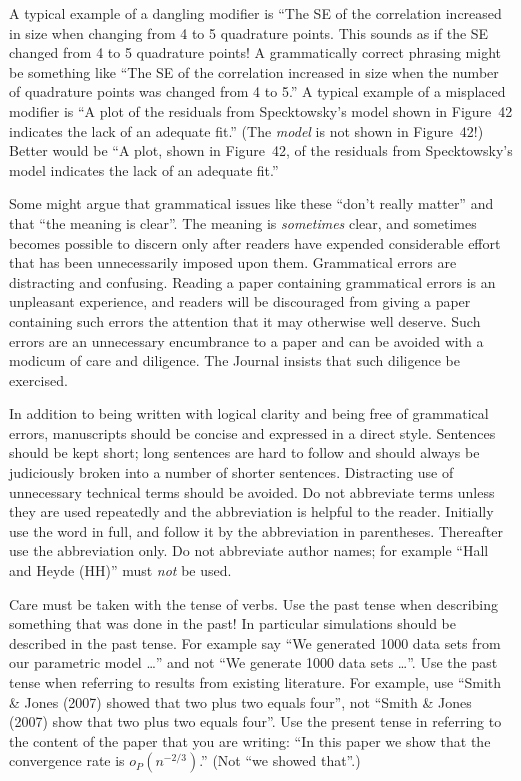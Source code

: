 \documentclass[times, doublespace]{anzsauth}
\begin{document}
A typical example of a dangling modifier is ``The SE of the
correlation increased in size when changing from 4 to 5 quadrature
points.  This sounds as if the SE changed from 4 to 5 quadrature
points!  A grammatically correct phrasing might be something like
``The SE of the correlation increased in size when the number of
quadrature points was changed from 4 to 5.''  A typical example of a
misplaced modifier is ``A plot of the residuals from Specktowsky's
model shown in Figure~42 indicates the lack of an adequate fit.''
(The \emph{model} is not shown in Figure~42!)  Better would be
``A plot, shown in Figure~42, of the residuals from Specktowsky's
model indicates the lack of an adequate fit.''

Some might argue that grammatical issues like these ``don't
really matter'' and that ``the meaning is clear''.  The meaning
is \emph{sometimes} clear, and sometimes becomes  possible to
discern only after readers have expended considerable effort that
has been unnecessarily imposed upon them.  Grammatical errors are
distracting and confusing.  Reading a paper containing grammatical
errors is an unpleasant experience, and readers will be discouraged
from giving a paper containing such errors the attention that it may
otherwise well deserve.  Such errors are an unnecessary encumbrance
to a paper and can be avoided with a modicum of care and diligence.
The Journal insists that such diligence be exercised.

In addition to being written with logical clarity and being free
of grammatical errors, manuscripts should be concise and expressed
in a direct style. Sentences should be kept short; long sentences
are hard to follow and should always be judiciously broken into
a number of shorter sentences.  Distracting use of unnecessary
technical terms should be avoided.  Do not abbreviate terms
unless they are used repeatedly and the abbreviation is helpful
to the reader. Initially use the word in full, and follow it by
the abbreviation in parentheses.  Thereafter use the abbreviation
only. Do not abbreviate author names; for example ``Hall and Heyde
(HH)'' must \emph{not} be used.

Care must be taken with the tense of verbs.  Use the past tense
when describing something that was done in the past! In particular
simulations should be described in the past tense.  For example say
``We generated 1000 data sets from our parametric model \ldots''
and not ``We generate 1000 data sets \ldots''.  Use the past tense
when referring to results from existing literature.  For example,
use ``Smith \& Jones (2007) showed that two plus two equals four'',
not ``Smith \& Jones (2007) show that two plus two equals four''.
Use the present tense in referring to the content of the paper that
you are writing: ``In this paper we show that the convergence rate
is $o_P(n^{-2/3})$.''  (Not ``we showed that''.)
\end{document}

